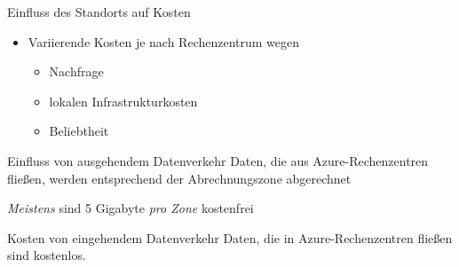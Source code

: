 \begin{flashcard}[\ ]{Einfluss des Standorts auf Kosten}
    \begin{itemize}
        \item Variierende Kosten je nach Rechenzentrum wegen
        \begin{itemize}
            \item Nachfrage
            \item lokalen Infrastrukturkosten
            \item Beliebtheit
        \end{itemize}
    \end{itemize}

\end{flashcard}

\begin{flashcard}[\ ]{Einfluss von ausgehendem Datenverkehr}
    Daten, die aus Azure-Rechenzentren fließen, werden entsprechend der Abrechnungszone abgerechnet

    \vspace{5mm}
    \emph{Meistens} sind 5 Gigabyte \emph{pro Zone} kostenfrei
\end{flashcard}

\begin{flashcard}[\ ]{Kosten von eingehendem Datenverkehr}
    Daten, die in Azure-Rechenzentren fließen sind kostenlos.
\end{flashcard}


